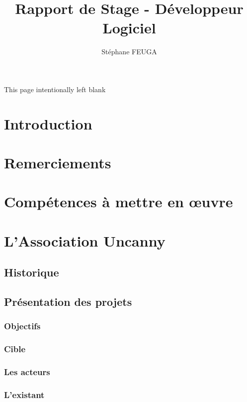 \documentclass[11pt,a4paper]{report}
\author{Stéphane FEUGA}
\title{Rapport de Stage - Développeur Logiciel}
\begin{document}
\maketitle

\begin{center}
This page intentionally left blank
\thispagestyle{empty}
\end{center}

\tableofcontents

\chapter{Introduction}

\chapter*{Remerciements}

\chapter*{Compétences à mettre en œuvre}

\chapter{L'Association Uncanny}
	\section{Historique}
	\section{Présentation des projets}
		\subsection{Objectifs}
		\subsection{Cible}
		\subsection{Les acteurs}
		\subsection{L'existant}
\end{document}
